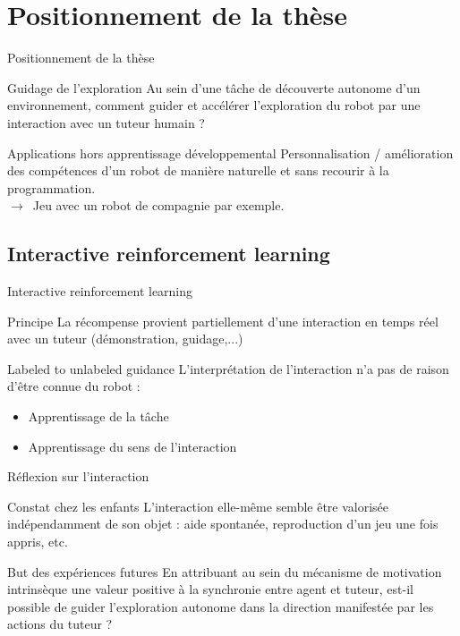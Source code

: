\documentclass[xcolor=pst,dvips,12pt,english,french]{beamer}
\begin{document}
	
	
	\section{Positionnement de la thèse}

	\begin{frame}{Positionnement de la thèse}
		\begin{block}{Guidage de l'exploration}
			Au sein d'une tâche de découverte autonome d'un environnement, comment guider et accélérer l'exploration du robot par une interaction avec un tuteur humain ?
		\end{block}
		\begin{exampleblock}{Applications hors apprentissage développemental}
			Personnalisation / amélioration des compétences d'un robot de manière naturelle et sans recourir à la programmation.
			 \\ 
			$\to\,$ Jeu avec un robot de compagnie par exemple.
		\end{exampleblock}
	\end{frame}
	
	\subsection{Interactive reinforcement learning}
	
	\begin{frame}{Interactive reinforcement learning}
		\begin{block}{Principe}
			La récompense provient partiellement d'une interaction en temps réel avec un tuteur (démonstration, guidage,...)
		\end{block}
		\begin{exampleblock}{Labeled to unlabeled guidance}
			L'interprétation de l'interaction n'a pas de raison d'être connue du robot :
			\begin{itemize}
				\item Apprentissage de la tâche 
				\item Apprentissage du sens de l'interaction
			\end{itemize}
		\end{exampleblock}
	\end{frame}
	
	\begin{frame}{Réflexion sur l'interaction}
		\begin{block}{Constat chez les enfants}
			L'interaction elle-même semble être valorisée indépendamment de son objet : aide spontanée, reproduction d'un jeu une fois appris, etc.
		\end{block}
		\begin{exampleblock}{But des expériences futures}
			En attribuant au sein du mécanisme de motivation intrinsèque une valeur positive à la synchronie entre agent et tuteur, est-il possible de guider l'exploration autonome dans la direction manifestée par les actions du tuteur ? 
		\end{exampleblock}
	\end{frame}
	
\end{document}
